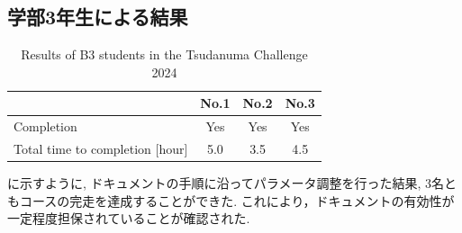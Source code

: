 \subsection{学部3年生による結果}
\begin{table}[htbp]
  \centering
  \caption{Results of B3 students in the Tsudanuma Challenge 2024}
  \label{tab:b3_results}
  \begin{tabular}{lccc}
    \hline
     & \textbf{No.1} & \textbf{No.2} & \textbf{No.3} \\
    \hline
    Completion & Yes & Yes & Yes \\
    Total time to completion [hour] & 5.0 & 3.5 & 4.5 \\
    \hline
  \end{tabular}
\end{table}
に示すように, ドキュメントの手順に沿ってパラメータ調整を行った結果, 3名ともコースの完走を達成することができた. 
これにより，ドキュメントの有効性が一定程度担保されていることが確認された. 


